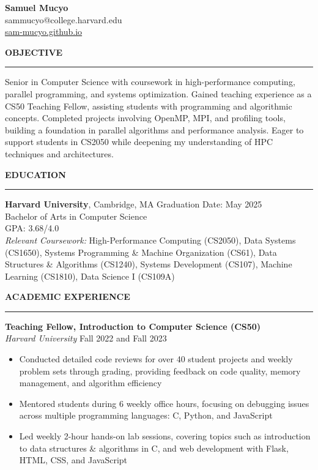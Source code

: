 \documentclass[11pt,a4paper]{article}
\newcommand{\sectionheading}[1]{\vspace{0.2cm}\textbf{\Large #1}\vspace{0.1cm}\hrule\vspace{0.3cm}}
\newcommand{\subheading}[1]{\textbf{#1}}
\newcommand{\daterange}[1]{\hfill{#1}}
\begin{document}
\begin{center}
    \textbf{\LARGE Samuel Mucyo}\\
    \vspace{0.3cm}
    sammucyo@college.harvard.edu \\
    \href{https://sam-mucyo.github.io/}{sam-mucyo.github.io} \\
\end{center}

\sectionheading{OBJECTIVE}
Senior in Computer Science with coursework in high-performance computing, parallel programming, and systems optimization. Gained teaching experience as a CS50 Teaching Fellow, assisting students with programming and algorithmic concepts. Completed projects involving OpenMP, MPI, and profiling tools, building a foundation in parallel algorithms and performance analysis. Eager to support students in CS2050 while deepening my understanding of HPC techniques and architectures.

\sectionheading{EDUCATION}
\subheading{Harvard University}, Cambridge, MA \daterange{Graduation Date: May 2025}\\
Bachelor of Arts in Computer Science\\
GPA: 3.68/4.0\\
\textit{Relevant Coursework:} High-Performance Computing (CS2050), Data Systems (CS1650), Systems Programming \& Machine Organization (CS61), Data Structures \& Algorithms (CS1240), Systems Development (CS107), Machine Learning (CS1810), Data Science I (CS109A)

\sectionheading{ACADEMIC EXPERIENCE}
\subheading{Teaching Fellow, Introduction to Computer Science (CS50)}\\
\textit{Harvard University} \daterange{Fall 2022 and Fall 2023}
\begin{itemize}[leftmargin=*,nosep]
    \item Conducted detailed code reviews for over 40 student projects and weekly problem sets through grading, providing feedback on code quality, memory management, and algorithm efficiency
    \item Mentored students during 6 weekly office hours, focusing on debugging issues across multiple programming languages: C, Python, and JavaScript
    \item Led weekly 2-hour hands-on lab sessions, covering topics such as introduction to data structures \& algorithms in C, and web development with Flask, HTML, CSS, and JavaScript
\end{itemize}
\end{document}
